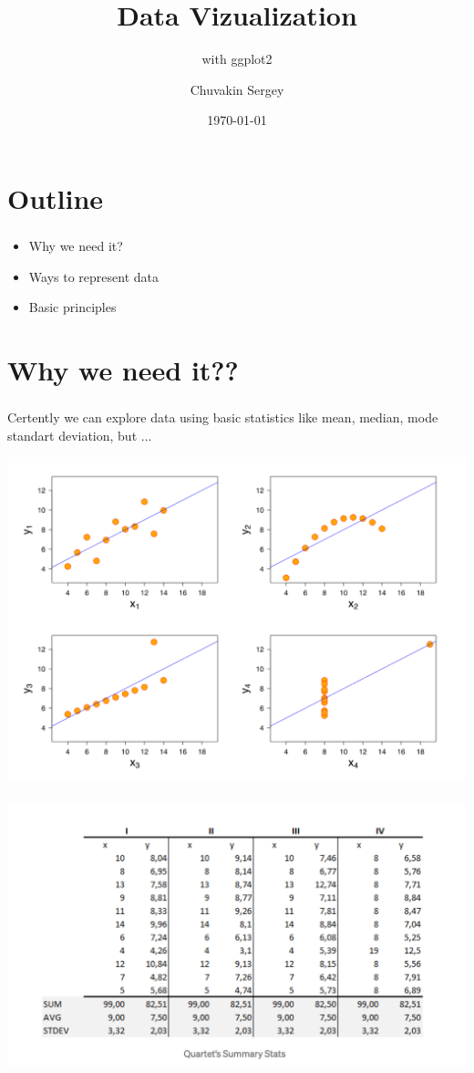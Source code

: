 \documentclass[t, 11pt]{beamer}
\title {Data Vizualization}
\subtitle{with ggplot2}
\author{Chuvakin Sergey}
\date{\today}
\institute[<<Anthropology>>]{<<School of Advanced Studies>>}
\begin{document}
	
	\frame[plain]{\titlepage}		
	
	\section{Outline}
	
		\begin{frame} 
			\frametitle{\insertsection} 
			\begin{itemize}
				\item Why we need it?
				\item Ways to represent data
				\item Basic principles
			\end{itemize}
		\end{frame}
	\section{Why we need it??}
			\begin{frame} 
		\frametitle{\insertsection} 
	Certently we can explore data using basic statistics like mean, median, mode standart deviation, but ...
	  	\begin{center}
	 	\includegraphics[scale=0.3]{quartet}
	 \end{center}
	\end{frame}

			\begin{frame} 
	\frametitle{\insertsection} 
	\begin{center}
		\includegraphics[scale=0.5]{stat_quart}
	\end{center}
\end{frame}
\end{document}
